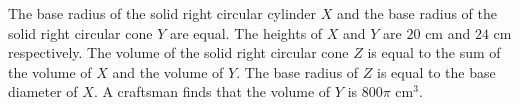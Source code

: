 
\question
The base radius of the solid right circular cylinder $X$ and the base radius of the solid right circular cone $Y$ are equal. The heights of $X$ and $Y$ are $20\text{ cm}$ and $24\text{ cm}$ respectively. The volume of the solid right circular cone $Z$ is equal to the sum of the volume of $X$ and the volume of $Y$. The base radius of $Z$ is equal to the base diameter of $X$. A craftsman finds that the volume of $Y$ is $800\pi\text{ cm}^3$.

